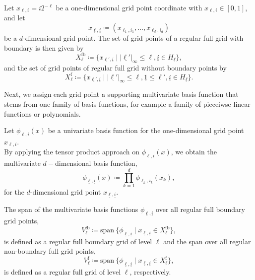\documentclass[
  a4paper,  %
  twoside,  %
  bibliography=totoc,
  headsepline,
  cleardoublepage=empty,
  parskip=half,
  draft=false
]{scrbook}
\begin{document}
\begin{definition}
Let $x_{\ell,i}=i2^{-\ell}$ be a one-dimensional grid point coordinate with $x_{\ell,i} \in [0,1]$, and let
\begin{equation}
x_{\underline{\ell},\underline{i}} \coloneqq (x_{\ell_1,i_1}, \dots, x_{\ell_d,i_d})
\end{equation}
be a $d$-dimensional grid point. The set of grid points of a regular full grid with boundary is then given by
\begin{equation}
X^{\mathrm{fb}}_{\ell} \coloneqq \{x_{\underline{\ell'},\underline{i}} \mid |\underline{\ell'}|_{\infty} \leq \ell, \underline{i} \in H_{\underline{\ell}}\},
\end{equation}
and the set of grid points of regular full grid without boundary points by
\begin{equation}
X^{\mathrm{f}}_{\ell} \coloneqq \{x_{\underline{\ell'},\underline{i}} \mid |\underline{\ell'}|_{\infty} \leq \ell, \underline{1} \leq \ell',  \underline{i} \in H_{\underline{\ell}}\}.
\end{equation}
\end{definition}
%
Next, we assign each grid point a supporting multivariate basis function that stems from one family of basis functions, for example a family of pieceiwse linear functions or polynomials.

\begin{definition}
Let $\phi_{\ell,i}(x)$ be a univariate basis function for the one-dimensional grid point $x_{\ell,i}$.\\
By applying the tensor product approach on $\phi_{\ell,i}(x)$, we obtain the multivariate $d-$dimensional basis function,
\begin{equation}
\phi_{\underline{\ell},\underline{i}}(x) \coloneqq \prod_{k=1}^{d} \phi_{\ell_k,i_k}(x_k),
\end{equation}
for the $d$-dimensional grid point $x_{\underline{\ell},\underline{i}}$.
\label{def:basis_functions}
\end{definition}
%
\begin{definition}
The span of the multivariate basis functions $\phi_{\underline{\ell},\underline{i}}$ over all regular full boundary grid points,
\begin{equation}
V^{\mathrm{fb}}_{\ell} \coloneqq \mathrm{span}~ \{\phi_{\underline{\ell},\underline{i}} \mid x_{\underline{\ell},\underline{i}} \in X^{\mathrm{fb}}_{\ell}\},
\end{equation}
is defined as a regular full boundary grid of level $\ell$ and the span over all regular non-boundary full grid points,
\begin{equation}
V^{\mathrm{f}}_{\ell} \coloneqq \mathrm{span}~ \{\phi_{\underline{\ell},\underline{i}} \mid x_{\underline{\ell},\underline{i}} \in X^{\mathrm{f}}_{\ell}\},
\end{equation}
is defined as a regular full grid of level $\ell$, respectively.
\label{def:full_grid}
\end{definition}
\end{document}
